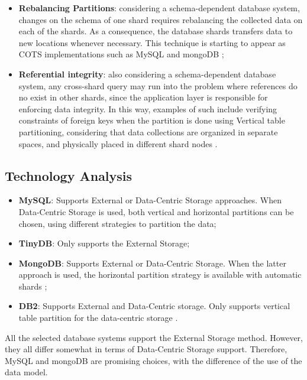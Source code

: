 \begin{itemize}
  \item \textbf{Rebalancing Partitions}: considering a schema-dependent database
  system, changes on the schema of one shard requires rebalancing the
  collected data on each of the shards. As a consequence, the database shards
  transfers data to new locations whenever necessary. This technique is
  starting to appear as COTS implementations such as MySQL \cite{mysql} and
  mongoDB \cite{mongodb};
  \item \textbf{Referential integrity}: also considering a schema-dependent
  database system, any cross-shard query may run into the problem where
  references do no exist in other shards, since the application layer is
  responsible for enforcing data integrity. In this way, examples of such
  include verifying constraints of foreign keys when the partition is done
  using Vertical table partitioning, considering that data collections are
  organized in separate spaces, and physically placed in different shard nodes
  \cite{db-partitioning-relational}.
\end{itemize}

\subsection{Technology Analysis}

\begin{itemize}
  \item \textbf{MySQL}: Supports External or Data-Centric Storage approaches.
  When Data-Centric Storage is used, both vertical and horizontal partitions
  \cite{db-partitioning-relational} can be chosen, using different strategies
  to partition the data;
  \item \textbf{TinyDB}: Only supports the External Storage;
  \item \textbf{MongoDB}: Supports External or Data-Centric Storage. When the
  latter approach is used, the horizontal partition strategy is available with
  automatic shards \cite{db-mongo-partition};
  \item \textbf{DB2}: Supports External and Data-Centric storage. Only supports
  vertical table partition for the data-centric storage \cite{db-db2-partition}.
\end{itemize}

All the selected database systems support the External Storage method. However,
they all differ somewhat in terms of Data-Centric Storage support. Therefore,
MySQL and mongoDB are promising choices, with the difference of the use of the data model.

